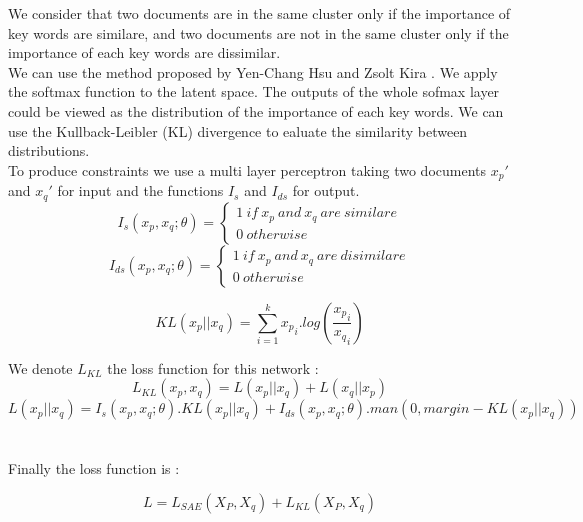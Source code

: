 \documentclass{article}
\begin{document}
We consider that two documents are in the same cluster only if the
importance of key words are similare, and two documents are not in the
same cluster only if the importance of each key words are dissimilar.
\\
We can use the method proposed by Yen-Chang Hsu and Zsolt Kira
\cite{2015arXiv151106321H}. We apply the softmax function to the
latent space. The outputs of the whole sofmax layer could be viewed as
the distribution of the importance of each key words. We can use the
Kullback-Leibler (KL) divergence to ealuate the similarity between
distributions.
\\
To produce constraints we use a multi layer perceptron taking two
documents $x_p'$ and $x_q'$ for input and the functions $I_s$ and
$I_{ds}$ for output.
\begin{equation}\label{eq:Is}
I_s(x_p, x_q; \theta) = \left\{
    \begin{array}{ll}
        1~if~x_p~and~x_q~are~similare \\
        0~otherwise
    \end{array}
\right.
\end{equation}
\begin{equation}\label{eq:Ids}
I_{ds}(x_p, x_q; \theta) = \left\{
    \begin{array}{ll}
        1~if~x_p~and~x_q~are~disimilare \\
        0~otherwise
    \end{array}
    \right.
\end{equation}

\begin{equation}\label{eq:KL}
KL(x_p || x_q) = \sum_{i=1}^k {x_p}_i . log(\frac{{x_p}_i}{{x_q}_i}) 
\end{equation}

We denote $L_{KL}$ the loss function for this network :
\begin{equation}\label{eq:LossKL}
L_{KL}(x_p, x_q) = L(x_p || x_q) + L(x_q || x_p) 
\end{equation}
\begin{equation}\label{eq:KLpq}
  L(x_p || x_q) = I_s(x_p, x_q; \theta) . KL(x_p || x_q) +
  I_{ds}(x_p, x_q; \theta) . man(0, margin - KL(x_p || x_q))
\end{equation}
\\ \\
Finally the loss function is :

\begin{equation}\label{eq:loss_FINALE}
  L = L_{SAE}(X_P, X_q) + L_{KL}(X_P, X_q)
\end{equation}
\end{document}

